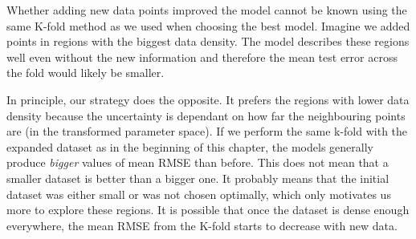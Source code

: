 Whether adding new data points improved the model cannot be known using the same K-fold method as we used when choosing the best model. Imagine we added points in regions with the biggest data density. The model describes these regions well even without the new information and therefore the mean test error across the fold would likely be smaller. 

In principle, our strategy does the opposite. It prefers the regions with lower data density because the uncertainty is dependant on how far the neighbouring points are (in the transformed parameter space). If we perform the same k-fold with the expanded dataset as in the beginning of this chapter, the models generally produce \textit{bigger} values of mean RMSE than before. This does not mean that a smaller dataset is better than a bigger one. It probably means that the initial dataset was either small or was not chosen optimally, which only motivates us more to explore these regions. It is possible that once the dataset is dense enough everywhere, the mean RMSE from the K-fold starts to decrease with new data.


